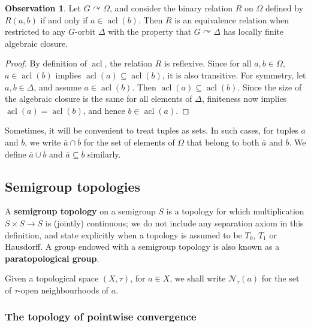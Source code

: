 \documentclass{article}
\theoremstyle{remark}
\theoremstyle{definition}
\newtheorem{observation}[theorem]{Observation}
\def\acts{\curvearrowright}
\DeclareMathOperator{\acl}{acl}
\def\a{\overline{a}}
\def\b{\overline{b}}
\begin{document}
{{{\begin{observation}\label{closure transitivity and local finiteness}
	{Let $G\acts \Omega$, and consider the binary relation $R$ on $\Omega$ defined by  $R(a,b)$ if and only if $a\in\acl(b)$. Then $R$ is an equivalence relation when restricted to any  $G$-orbit $\Delta$ with the property that $G\acts\Delta$ has locally finite algebraic closure.}%
\end{observation}
\begin{proof}
	 By definition of $\acl$, the relation $R$ is reflexive. Since {for all $a,b\in\Omega$}, $a\in\acl(b)$ implies $\acl(a)\subseteq\acl(b)$, it is also transitive. For symmetry, let $a,b\in \Delta$, and assume  $a\in\acl(b)$. Then  $\acl(a)\subseteq\acl(b)$. Since the size of the algebraic closure is the same for all elements of $\Delta$, finiteness now implies  $\acl(a)=\acl(b)$, and hence  $b\in\acl(a)$.
\end{proof}

 {Sometimes, it will be convenient to treat tuples as sets. In such cases, for tuples $\a$ and $\b$, we write %
      $\overline{a}\cap\overline{b}$ for the set of elements of $\Omega$ that belong to both $\overline{a}$ and $\overline{b}$. We define $\overline{a}\cup\overline{b}$ and $\overline{a}\subseteq\overline{b}$ similarly.




 \subsection{Semigroup topologies}

 {A \textbf{semigroup topology} on a semigroup $S$ is a topology for which multiplication $S\times S\to S$ is (jointly) continuous; we do not include any separation axiom in this definition, and state explicitly when a topology is assumed to be $T_0$, $T_1$ or Hausdorff. A group endowed with a semigroup topology is also known as a \textbf{paratopological group}.}

 {Given a topological space $(X, \tau)$, for $a\in X$, we shall write $\mathcal{N}_\tau(a)$ for the set of $\tau$-open neighbourhoods of $a$.}


\subsubsection{The topology of pointwise convergence}\label{subsubsect:pw}

}}}}
\end{document}
